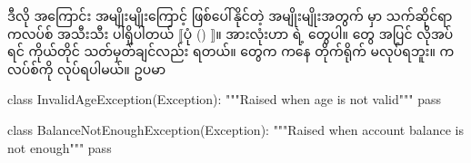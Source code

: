 ဒီလို အကြောင်း အမျိုးမျိုးကြောင့် ဖြစ်ပေါ်နိုင်တဲ့  အမျိုးမျိုးအတွက်  မှာ သက်ဆိုင်ရာ   ကလပ်စ် အသီးသီး ပါရှိပါတယ် $\big\llbracket$ပုံ (\fRefNo{\ref{fig:exceptionhier}}) $\big\rrbracket$။  အားလုံးဟာ  ရဲ့  တွေပါ။    တွေ အပြင် လိုအပ်ရင် ကိုယ်တိုင် သတ်မှတ်ချင်လည်း ရတယ်။  တွေက  ကနေ  တိုက်ရိုက်  မလုပ်ရဘူး။  ကလပ်စ်ကို  လုပ်ရပါမယ်။ ဥပမာ
%
\begin{py}
class InvalidAgeException(Exception):
    """Raised when age is not valid"""
    pass
\end{py}
\begin{py}
class BalanceNotEnoughException(Exception):
    """Raised when account balance is not enough"""
    pass
\end{py}
%


